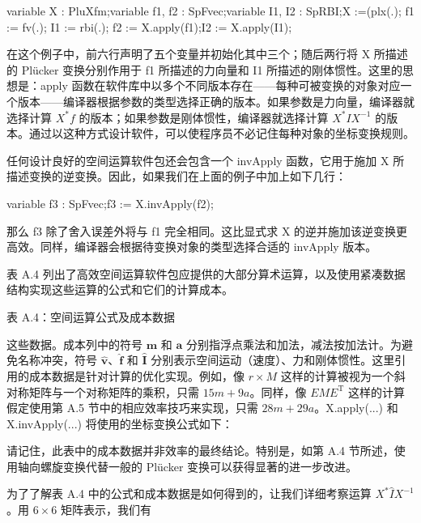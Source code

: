 \documentclass[10pt,a4paper]{book}
\theoremstyle{thmstyle} %
\theoremstyle{defstyle} %
\theoremstyle{prostyle} %
\begin{document}
variable X : PluXfm;variable f1, f2 : SpFvec;variable I1, I2 : SpRBI;X :=(plx(.); f1 := fv(.); I1 := rbi(.); f2 := X.apply(f1);I2 := X.apply(I1);



在这个例子中，前六行声明了五个变量并初始化其中三个；随后两行将 X 所描述的 Plücker 变换分别作用于 f1 所描述的力向量和 I1 所描述的刚体惯性。这里的思想是：apply 函数在软件库中以多个不同版本存在——每种可被变换的对象对应一个版本——编译器根据参数的类型选择正确的版本。如果参数是力向量，编译器就选择计算 $X^*f$ 的版本；如果参数是刚体惯性，编译器就选择计算 $X^*IX^{-1}$ 的版本。通过以这种方式设计软件，可以使程序员不必记住每种对象的坐标变换规则。



任何设计良好的空间运算软件包还会包含一个 invApply 函数，它用于施加 X 所描述变换的逆变换。因此，如果我们在上面的例子中加上如下几行：



variable f3 : SpFvec;f3 := X.invApply(f2);



那么 f3 除了舍入误差外将与 f1 完全相同。这比显式求 X 的逆并施加该逆变换更高效。同样，编译器会根据待变换对象的类型选择合适的 invApply 版本。



表 A.4 列出了高效空间运算软件包应提供的大部分算术运算，以及使用紧凑数据结构实现这些运算的公式和它们的计算成本。



表 A.4：空间运算公式及成本数据





这些数据。成本列中的符号 $\mathbf{m}$ 和 $\mathbf{a}$ 分别指浮点乘法和加法，减法按加法计。为避免名称冲突，符号 $\hat{\mathbf{v}}$、$\hat{\mathbf{f}}$ 和 $\hat{\mathbf{I}}$ 分别表示空间运动（速度）、力和刚体惯性。这里引用的成本数据是针对计算的优化实现。例如，像 $r \times M$ 这样的计算被视为一个斜对称矩阵与一个对称矩阵的乘积，只需 $15m + 9a$。同样，像 $EME^{\text{T}}$ 这样的计算假定使用第 A.5 节中的相应效率技巧来实现，只需 $28m + 29a$。X.apply(...) 和 X.invApply(...) 将使用的坐标变换公式如下：





请记住，此表中的成本数据并非效率的最终结论。特别是，如第 A.4 节所述，使用轴向螺旋变换代替一般的 Plücker 变换可以获得显著的进一步改进。



为了了解表 A.4 中的公式和成本数据是如何得到的，让我们详细考察运算 $X^*\hat{I}X^{-1}$。用 $6\times6$ 矩阵表示，我们有
\end{document}
